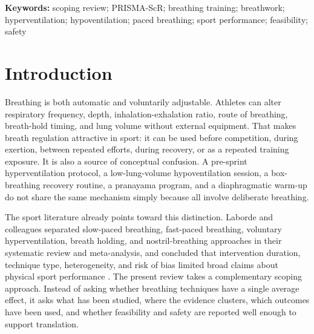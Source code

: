 \documentclass[12pt,a4paper]{article}
\begin{document}
\begin{center}
\end{center}

\noindent\textbf{Keywords:} scoping review; PRISMA-ScR; breathing training; breathwork; hyperventilation; hypoventilation; paced breathing; sport performance; feasibility; safety

\section{Introduction}
Breathing is both automatic and voluntarily adjustable. Athletes can alter respiratory frequency, depth, inhalation-exhalation ratio, route of breathing, breath-hold timing, and lung volume without external equipment. That makes breath regulation attractive in sport: it can be used before competition, during exertion, between repeated efforts, during recovery, or as a repeated training exposure. It is also a source of conceptual confusion. A pre-sprint hyperventilation protocol, a low-lung-volume hypoventilation session, a box-breathing recovery routine, a pranayama program, and a diaphragmatic warm-up do not share the same mechanism simply because all involve deliberate breathing.

The sport literature already points toward this distinction. Laborde and colleagues separated slow-paced breathing, fast-paced breathing, voluntary hyperventilation, breath holding, and nostril-breathing approaches in their systematic review and meta-analysis, and concluded that intervention duration, technique type, heterogeneity, and risk of bias limited broad claims about physical sport performance \parencite{Laborde31122024}. The present review takes a complementary scoping approach. Instead of asking whether breathing techniques have a single average effect, it asks what has been studied, where the evidence clusters, which outcomes have been used, and whether feasibility and safety are reported well enough to support translation.
\end{document}
